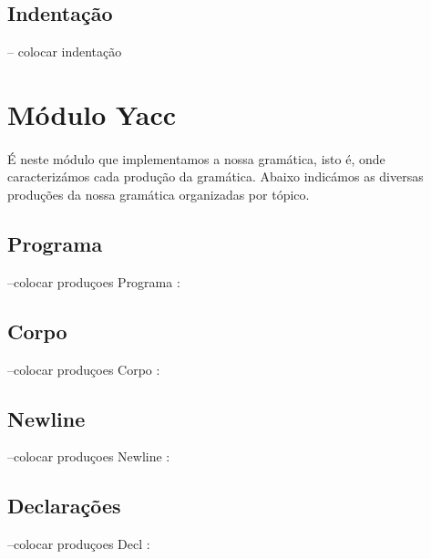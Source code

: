 \documentclass[11pt,a4paper]{report}
\begin{document}
    \paragraph{}
    \subsection{Indentação}
    -- colocar indentação

    
    \section{Módulo Yacc}
    \paragraph{}
    É neste módulo que implementamos a nossa gramática, isto é, onde caracterizámos cada produção da gramática.
    Abaixo indicámos as diversas produções da nossa gramática organizadas por tópico.
    
    \paragraph{}
    \subsection{Programa}
       --colocar produçoes Programa : 
      
    \paragraph{}
    \subsection{Corpo}
       --colocar produçoes Corpo :

    \paragraph{}
    \subsection{Newline}
       --colocar produçoes Newline :

    \paragraph{}
    \subsection{Declarações}
       --colocar produçoes Decl :
\end{document}
